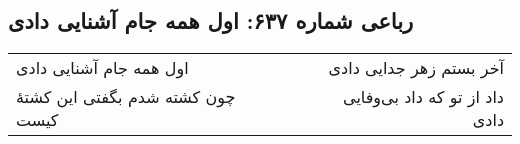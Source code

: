 \begin{center}
\section*{رباعی شماره ۶۳۷: اول همه جام آشنایی دادی}
\label{sec:sh637}
\begin{longtable}{l p{0.5cm} r}
اول همه جام آشنایی دادی
&&
آخر بستم زهر جدایی دادی
\\
چون کشته شدم بگفتی این کشتهٔ کیست
&&
داد از تو که داد بی‌وفایی دادی
\\
\end{longtable}
\end{center}
